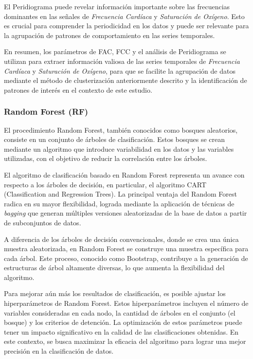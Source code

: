 El Peridiograma puede revelar información importante sobre las frecuencias dominantes en las señales de \textit{Frecuencia Cardíaca} y \textit{Saturación de Oxígeno}. Esto es crucial para comprender la periodicidad en los datos y puede ser relevante para la agrupación de patrones de comportamiento en las series temporales.

En resumen, los parámetros de FAC, FCC y el análisis de Peridiograma se utilizan para extraer información valiosa de las series temporales de \textit{Frecuencia Cardíaca} y \textit{Saturación de Oxígeno}, para que se facilite la agrupación de datos mediante el método de clusterización anteriormente descrito y la identificación de patrones de interés en el contexto de este estudio.


\subsubsection{Random Forest (RF)}\label{sec:rf}

El procedimiento Random Forest, también conocidos como bosques aleatorios, consiste en un conjunto de árboles de clasificación. Estos bosques se crean mediante un algoritmo que introduce variabilidad en los datos y las variables utilizadas, con el objetivo de reducir la correlación entre los árboles.

El algoritmo de clasificación basado en Random Forest representa un avance con respecto a los árboles de decisión, en particular, el algoritmo CART (Classification and Regression Trees). La principal ventaja del Random Forest radica en su mayor flexibilidad, lograda mediante la aplicación de técnicas de \textit{bagging} que generan múltiples versiones aleatorizadas de la base de datos a partir de subconjuntos de datos.

A diferencia de los árboles de decisión convencionales, donde se crea una única muestra aleatorizada, en Random Forest se construye una muestra específica para cada árbol. Este proceso, conocido como Bootstrap, contribuye a la generación de estructuras de árbol altamente diversas, lo que aumenta la flexibilidad del algoritmo.

Para mejorar aún más los resultados de clasificación, es posible ajustar los hiperparámetros de Random Forest. Estos hiperparámetros incluyen el número de variables consideradas en cada nodo, la cantidad de árboles en el conjunto (el bosque) y los criterios de detención. La optimización de estos parámetros puede tener un impacto significativo en la calidad de las clasificaciones obtenidas. En este contexto, se busca maximizar la eficacia del algoritmo para lograr una mejor precisión en la clasificación de datos.

